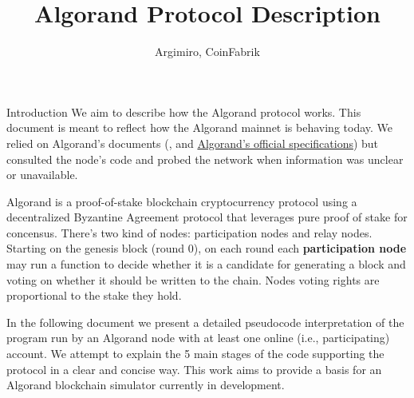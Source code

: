\documentclass[10pt,a4paper]{article}
\author{Argimiro, CoinFabrik}
\title{Algorand Protocol Description}
\begin{document}
\maketitle
\tableofcontents

\begin{section}{Introduction}
We aim to describe how the Algorand protocol works. 
This document is meant to reflect how the Algorand mainnet is behaving
today. We relied on Algorand's documents (\cite{DBLP:conf/sosp/GiladHMVZ17},
\cite{DBLP:journals/corr/Micali16} and 
\href{https://github.com/algorandfoundation/specs}{Algorand's official specifications})
but consulted the node's code and probed the network when information was unclear or 
unavailable.


Algorand is a proof-of-stake blockchain cryptocurrency protocol 
using a decentralized Byzantine Agreement protocol that leverages 
pure proof of stake for concensus. 
There's two kind of nodes: participation nodes and relay nodes.
Starting on the genesis block (round 0), on each round each
{\bf participation node} may run a function to decide whether it is 
a candidate for generating a block and voting  on whether it should 
be written to the chain.
Nodes voting rights are proportional to the stake they hold.

In the following document we present a detailed pseudocode interpretation 
of the program run by an Algorand node with at least one online (i.e., participating) 
account. We attempt to explain the 5 main stages of the code supporting 
the protocol in a clear and concise way.
This work aims to provide a basis for an Algorand blockchain simulator 
currently in development. 


\end{section}
\end{document}
